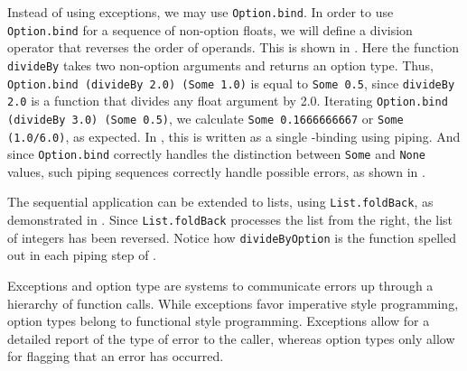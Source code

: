 \documentclass[fsharpnotes.tex]{subfiles}
\begin{document}
Instead of using exceptions, we may use \lstinline{Option.bind}. In order to use \lstinline{Option.bind} for a sequence of non-option floats, we will define a division operator that reverses the order of operands. This is shown in .
%
%
Here the function \lstinline{divideBy} takes two non-option arguments and returns an option type. Thus, \lstinline{Option.bind (divideBy 2.0) (Some 1.0)} is equal to \lstinline{Some 0.5}, since \lstinline{divideBy 2.0} is a function that divides any float argument by 2.0. Iterating \lstinline{Option.bind (divideBy 3.0) (Some 0.5)}, we calculate \lstinline{Some 0.1666666667} or \lstinline{Some (1.0/6.0)}, as expected. In , this is written as a single -binding using piping. And since \lstinline{Option.bind} correctly handles the distinction between \lstinline{Some} and \lstinline{None} values, such piping sequences correctly handle possible errors, as shown in .

The sequential application can be extended to lists, using \lstinline{List.foldBack}, as demonstrated in .
%
%
Since \lstinline{List.foldBack} processes the list from the right, the list of integers has been reversed. Notice how \lstinline{divideByOption} is the function spelled out in each piping step of .

Exceptions and option type are systems to communicate errors up through a hierarchy of function calls. While exceptions favor imperative style programming, option types belong to functional style programming. Exceptions allow for a detailed report of the type of error to the caller, whereas option types only allow for flagging that an error has occurred.

\begin{comment}
  \begin{itemize}
  \item exn type Spec-4.0 Chapter 18.1
  \item Spec-4.0 Section 18.2.
  \item Husk, som if-else skal try-with branches være af samme type. Giv eksempel på parsning af argument til selvdefineret exception. Gå problem med divmed0exception igennem: 3 cases, failsafe værdier, undtagelser, eller option typer.
  \item Extend railway paradigm, \url{https://fsharpforfunandprofit.com/posts/computation-expressions-bind/}
  \item Extend notion of exception heriarchy and relation to catching or not.
  \end{itemize}
\end{comment}
\end{document}
